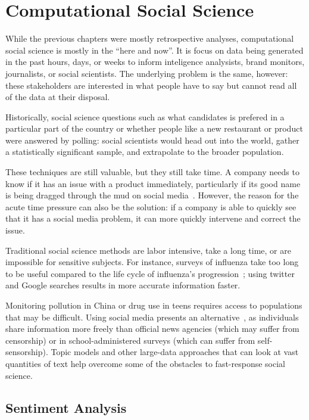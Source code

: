 
\chapter{Computational Social Science}
\label{ch:css}

While the previous chapters were mostly retrospective analyses, computational
social science is mostly in the ``here and now''.  It is focus on data
being generated in the past hours, days, or weeks to inform
inteligence analysists, brand monitors, journalists, or social
scientists.  The underlying problem is the same, however: these
stakeholders are interested in what people have to say but cannot read
all of the data at their disposal.

Historically, social science questions such as what candidates is
prefered in a particular part of the country or whether people like a
new restaurant or product were answered by polling: social scientists
would head out into the world, gather a statistically significant
sample, and extrapolate to the broader population.

These techniques are still valuable, but they still take time.  A
company needs to know if it has an issue with a product immediately,
particularly if its good name is being dragged through the mud on
social media~\cite{bowen-16}.  However, the reason for the acute time
pressure can also be the solution: if a company is able to quickly see
that it has a social media problem, it can more quickly intervene and
correct the issue.

Traditional social science methods are labor intensive, take a long
time, or are impossible for sensitive subjects.  For instance, surveys
of influenza take too long to be useful compared to the life cycle of
influenza's progression~\cite{broniatowsky-15}; using twitter and
Google searches results in more accurate information faster.

Monitoring pollution in China or drug use in teens requires access to
populations that may be difficult.  Using social media presents an
alternative~\cite{wang:paul:dredze-15}, as individuals share
information more freely than official news agencies (which may suffer
from censorship) or in school-administered surveys (which can suffer
from self-sensorship).  Topic models and other large-data approaches
that can look at vast quantities of text help overcome some of the
obstacles to fast-response social science.

\section{Sentiment Analysis}

